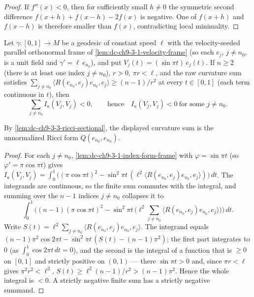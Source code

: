 \begin{proof}

  \sketch
  If $f''(x)<0$, then for sufficiently small $h\ne0$ the symmetric second
  difference $f(x+h)+f(x-h)-2f(x)$ is negative. One of $f(x+h)$ and
  $f(x-h)$ is therefore smaller than $f(x)$, contradicting local minimality.
\end{proof}
\begin{lemma}
  \label{lem:dc-ch9-3-1-index-sum-neg}


  Let $\gamma:[0,1]\to M$ be a geodesic of constant speed $\ell$ with the velocity-seeded
  parallel orthonormal frame of \cref{lem:dc-ch9-3-1-velocity-frame} (so each $e_j$, $j\ne n_0$,
  is a unit field and $\gamma'=\ell\,e_{n_0}$), and put $V_j(t)=(\sin\pi t)\,e_j(t)$. If $n\ge 2$
  (there is at least one index $j\ne n_0$), $r>0$, $\pi r<\ell$, and the raw curvature sum satisfies
  $\sum_{j\ne n_0}\langle R(e_{n_0},e_j)e_{n_0},e_j\rangle\ge (n-1)/r^2$ at every $t\in[0,1]$
  (each term continuous in $t$), then
  $$
  \sum_{j\ne n_0} I_a(V_j,V_j)<0,\qquad\text{hence}\quad I_a(V_j,V_j)<0\ \text{for some }j\ne n_0.
  $$

  By \cref{lem:dc-ch9-3-3-ricci-sectional}, the displayed curvature sum is
  the unnormalized Ricci form $Q(e_{n_0},e_{n_0})$.
\end{lemma}
\begin{proof}

  \sketch
  For each $j\ne n_0$, \cref{lem:dc-ch9-3-1-index-form-frame} with $\varphi=\sin\pi t$
  (so $\varphi'=\pi\cos\pi t$) gives
  $I_a(V_j,V_j)=\int_0^1\big((\pi\cos\pi t)^2-\sin^2\pi t\,(\ell^2\langle R(e_{n_0},e_j)e_{n_0},e_j\rangle)\big)\,dt$.
  The integrands are continuous, so the finite sum commutes with the integral, and summing over
  the $n-1$ indices $j\ne n_0$ collapses it to
  $$
  \int_0^1\Big((n-1)(\pi\cos\pi t)^2-\sin^2\pi t\,\big(\ell^2\textstyle\sum_{j\ne n_0}\langle R(e_{n_0},e_j)e_{n_0},e_j\rangle\big)\Big)\,dt.
  $$
  Write $S(t)=\ell^2\sum_{j\ne n_0}\langle R(e_{n_0},e_j)e_{n_0},e_j\rangle$. The integrand equals
  $(n-1)\pi^2\cos 2\pi t-\sin^2\pi t\,(S(t)-(n-1)\pi^2)$; the first part integrates to $0$
  (as $\int_0^1\cos 2\pi t\,dt=0$), and the second is the integral of a function that is $\ge 0$
  on $[0,1]$ and strictly positive on $(0,1)$ --- there $\sin\pi t>0$ and, since $\pi r<\ell$
  gives $\pi^2 r^2<\ell^2$, $S(t)\ge\ell^2(n-1)/r^2>(n-1)\pi^2$. Hence the whole integral is
  $<0$. A strictly negative finite sum has a strictly negative summand.
\end{proof}

